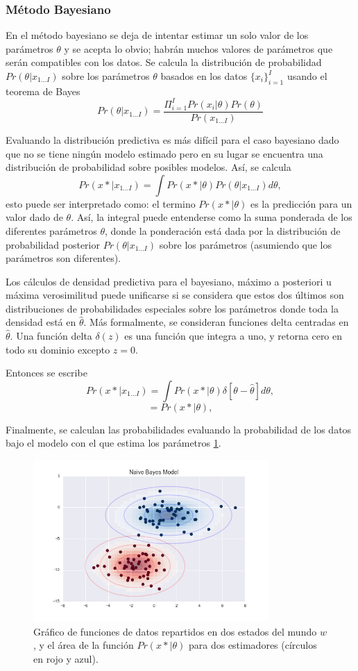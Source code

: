 \documentclass[letter,12pt]{report}
\begin{document}
\subsubsection{Método Bayesiano}
En el método bayesiano \cite{Bayes, Bayes2} se deja de intentar estimar un solo
valor de los parámetros $\theta$ y se acepta lo obvio; habrán muchos valores de
parámetros que serán compatibles con los datos. Se calcula la distribución de
probabilidad $Pr(\theta|x_{1...I})$ sobre los parámetros $\theta$ basados en
los datos $\{x_i\}_{i=1}^I$ usando el teorema de Bayes
$$Pr(\theta|x_{1...I})=\frac{\Pi_{i=1}^I
Pr(x_i|\theta)Pr(\theta)}{Pr(x_{1...I})}$$

Evaluando la distribución predictiva es más difícil para el caso bayesiano dado que no
se tiene ningún modelo estimado pero en su lugar se encuentra una distribución de
probabilidad sobre posibles modelos. Así, se calcula
$$Pr(x*|x_{1...I})=\int Pr(x*|\theta) Pr(\theta|x_{1...I})d\theta,$$
esto puede ser interpretado como: el termino $Pr(x*|\theta)$ es la predicción para un
valor dado de $\theta$. Así, la integral puede entenderse como la suma ponderada de los
diferentes parámetros $\theta$, donde la ponderación está dada por la distribución de
probabilidad posterior $Pr(\theta|x_{1...I})$ sobre los parámetros (asumiendo que
los parámetros son diferentes).

Los cálculos de densidad predictiva para el bayesiano, máximo a posteriori u máxima
verosimilitud puede unificarse si se considera que estos dos últimos son distribuciones
de probabilidades especiales sobre los parámetros donde toda la densidad está en
$\hat\theta$. Más formalmente, se consideran funciones delta centradas en
$\hat\theta$. Una función delta $\delta(z)$ es una función que integra a uno, y retorna
cero en todo su dominio excepto $z=0$.

Entonces se escribe
$$Pr(x*|x_{1...I})=\int Pr(x*|\theta) \delta[\theta - \hat\theta]d\theta,$$
$$=Pr(x*|\theta),$$ 

Finalmente, se calculan las probabilidades evaluando la probabilidad de los datos
bajo el modelo con el que estima los parámetros \ref{fig:bayes}.

\begin{figure}[H]
    \centering
    \includegraphics[width=0.8\textwidth]{bayes}
    \caption{Gráfico de funciones de datos repartidos en dos estados del mundo $w$, y el
    área de la función $Pr(x*|\theta)$ para dos estimadores (círculos en rojo y azul).}
    \label{fig:bayes}
\end{figure}
\end{document}

